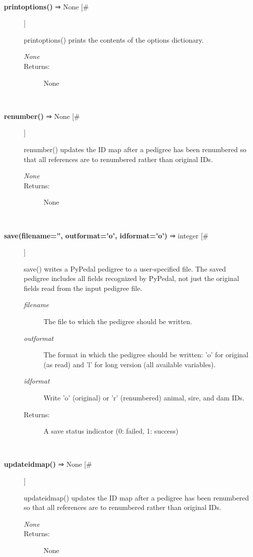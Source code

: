 \documentclass[10pt]{article}
\begin{document}
\begin{description}
\begin{description}
\end{description}
\\ 

\item[\textbf{printoptions()}
 ⇒ None [\#]]

 printoptions() prints the contents of the options dictionary.
\begin{description}
\item[\emph{None}
]
\item[Returns:] None

\end{description}
\\ 

\item[\textbf{renumber()}
 ⇒ None [\#]]

 renumber() updates the ID map after a pedigree has been renumbered so that all references are to renumbered rather than original IDs.
\begin{description}
\item[\emph{None}
]
\item[Returns:] None

\end{description}
\\ 

\item[\textbf{save(filename='', outformat='o', idformat='o')}
 ⇒ integer [\#]]

 save() writes a PyPedal pedigree to a user-specified file. The saved pedigree includes all fields recognized by PyPedal, not just the original fields read from the input pedigree file.
\begin{description}
\item[\emph{filename}
] The file to which the pedigree should be written.
\item[\emph{outformat}
] The format in which the pedigree should be written: 'o' for original (as read) and 'l' for long version (all available variables).
\item[\emph{idformat}
] Write 'o' (original) or 'r' (renumbered) animal, sire, and dam IDs.
\item[Returns:] A save status indicator (0: failed, 1: success)

\end{description}
\\ 

\item[\textbf{updateidmap()}
 ⇒ None [\#]]

 updateidmap() updates the ID map after a pedigree has been renumbered so that all references are to renumbered rather than original IDs.
\begin{description}
\item[\emph{None}
]
\item[Returns:] None

\end{description}
\\ 


\end{description}
\end{document}
